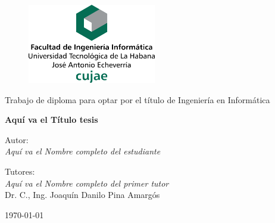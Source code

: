 \begin{figure}
	\centering
	\includegraphics[width=0.5\textwidth]{figuras/membrete-cujae-centrado.png}
\end{figure}

	\begin{center}
	
	\large{Trabajo de diploma para optar por el título de Ingeniería en Informática}

	\vspace{2cm}
	
	\LARGE{\textbf{Aquí va el Título tesis}}
	
	\vspace{2cm}
	
	\large{
	Autor:\\
	\emph{Aquí va el Nombre completo del estudiante}
	\vspace{0.5cm}
	
	Tutores:\\
	\emph{Aquí va el Nombre completo del primer tutor}\\
	Dr. C., Ing. Joaquín Danilo Pina Amargós 
	}
	
	\vspace{4cm}
	
	\small{\mifecha\today}
	
\end{center}	


